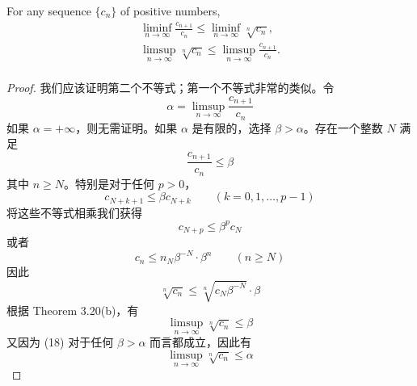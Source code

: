 \documentclass[../poma-notes.tex]{subfiles}
\begin{document}

\begin{theorem}
  For any sequence $\{c_n\}$ of positive numbers,
  \begin{gather*}
    \liminf_{n\to\infty}\frac{c_{n+1}}{c_n} \le \liminf_{n\to\infty}\sqrt[n]{c_n}, \\
    \limsup_{n\to\infty}\sqrt[n]{c_n} \le \limsup_{n\to\infty}\frac{c_{n+1}}{c_n}. \\
  \end{gather*}
\end{theorem}

\begin{proof}
  我们应该证明第二个不等式；第一个不等式非常的类似。令
  \[
    \alpha = \limsup_{n\to\infty} \frac{c_{n+1}}{c_n}
  \]
  如果 $\alpha = +\infty$，则无需证明。如果 $\alpha$ 是有限的，选择 $\beta > \alpha$。存在一个整数 $N$ 满足
  \[ \frac{c_{n+1}}{c_n} \le \beta \]
  其中 $n \ge N$。特别是对于任何 $p > 0$，
  \[ c_{N+k+1} \le \beta c_{N+k} \qquad (k=0,1,\dots,p-1) \]
  将这些不等式相乘我们获得
  \[ c_{N+p} \le \beta^p c_N \]
  或者
  \[ c_n \le n_N \beta^{-N} \cdot \beta^n \qquad (n \ge N) \]
  因此
  \[ \sqrt[n]{c_n} \le \sqrt[n]{c_N \beta^{-N}} \cdot \beta \]
  根据 Theorem 3.20(b)，有
  \begin{equation}
    \limsup_{n\to\infty} \sqrt[n]{c_n} \le \beta
  \end{equation}
  又因为 (18) 对于任何 $\beta > \alpha$ 而言都成立，因此有
  \[ \limsup_{n\to\infty} \sqrt[n]{c_n} \le \alpha \]
\end{proof}

\end{document}
